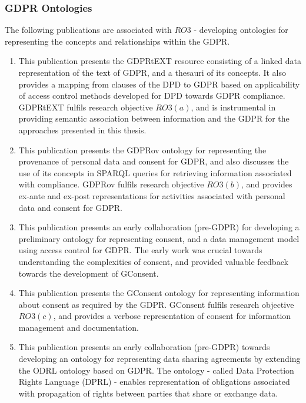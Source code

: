 \subsubsection{GDPR Ontologies}
The following publications are associated with $RO3$ - developing ontologies for representing the concepts and relationships within the GDPR.
\begin{enumerate}[start]
    \item \textbf{}
        \newline
        This publication presents the GDPRtEXT resource consisting of a linked data representation of the text of GDPR, and a thesauri of its concepts. It also provides a mapping from clauses of the DPD to GDPR based on applicability of access control methods developed for DPD towards GDPR compliance. GDPRtEXT fulfils research objective $RO3(a)$, and is instrumental in providing semantic association between information and the GDPR for the approaches presented in this thesis.
    \item \textbf{}
        \newline
        This publication presents the GDPRov ontology for representing the provenance of personal data and consent for GDPR, and also discusses the use of its concepts in SPARQL queries for retrieving information associated with compliance. GDPRov fulfils research objective $RO3(b)$, and provides ex-ante and ex-post representations for activities associated with personal data and consent for GDPR.
    \item \textbf{}
        \newline
        This publication presents an early collaboration (pre-GDPR) for developing a preliminary ontology for representing consent, and a data management model using access control for GDPR. The early work was crucial towards understanding the complexities of consent, and provided valuable feedback towards the development of GConsent.
    \item \textbf{}
        \newline
        This publication presents the GConsent ontology for representing information about consent as required by the GDPR. GConsent fulfils research objective $RO3(c)$, and provides a verbose representation of consent for information management and documentation.
    \item \textbf{}
        \newline
        This publication presents an early collaboration (pre-GDPR) towards developing an ontology for representing data sharing agreements by extending the ODRL ontology based on GDPR. The ontology - called Data Protection Rights Language (DPRL) - enables representation of obligations associated with propagation of rights between parties that share or exchange data.
\end{enumerate}

